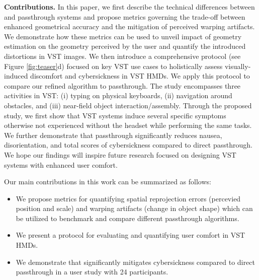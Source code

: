 \textbf{Contributions.} In this paper, we first describe the technical differences between \directpassthrough and \depthpassthrough passthrough systems and propose metrics governing the trade-off between enhanced geometrical accuracy and the mitigation of perceived warping artifacts. We demonstrate how these metrics can be used to unveil impact of geometry estimation on the geometry perceived by the user and quantify the introduced distortions in VST images.
We then introduce a comprehensive protocol (see Figure \ref{fig:teaser}d) focused on key VST use cases to holistically assess visually-induced discomfort and cybersickness in VST HMDs. We apply this protocol to compare our refined \depthpassthrough algorithm to \directpassthrough passthrough. The study encompasses three activities in VST: (i) typing on physical keyboards, (ii) navigation around obstacles, and (iii) near-field object interaction/assembly. Through the proposed study, we first show that VST systems induce several specific symptoms otherwise not experienced without the headset while performing the same tasks. We further demonstrate that \depthpassthrough passthrough significantly reduces nausea, disorientation, and total scores of cybersickness compared to direct passthrough.  We hope our findings will inspire future research focused on designing VST systems with enhanced user comfort. 

Our main contributions in this work can be summarized as follows:
\newcommand{\SubItem}[1]{
    {\setlength\itemindent{15pt} \item[-] #1}
}
\begin{itemize}
\item We propose metrics for quantifying spatial reprojection errors (percevied position and scale) and warping artifacts (change in object shape) which can be utilized to benchmark and compare different passthrough algorithms.
\item We present a protocol for evaluating and quantifying user comfort in VST HMDs. 
\item We demonstrate that \GAP significantly mitigates cybersickness compared to direct passthrough in a user study with 24 participants.
\end{itemize}

